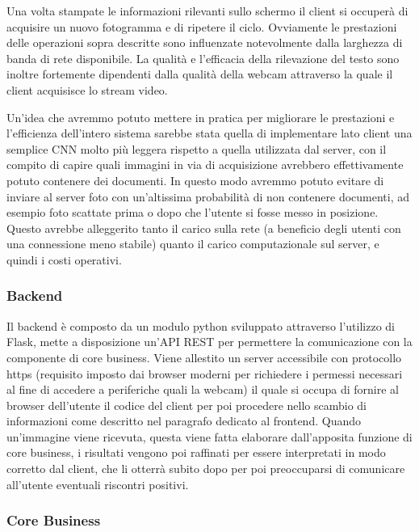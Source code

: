 \documentclass[12pt,a4paper]{article}
\begin{document}
Una volta stampate le informazioni rilevanti sullo schermo il client si
occuperà di acquisire un nuovo fotogramma e di ripetere il ciclo.
Ovviamente le prestazioni delle operazioni sopra descritte sono
influenzate notevolmente dalla larghezza di banda di rete disponibile.
La qualità e l'efficacia della rilevazione del testo sono inoltre
fortemente dipendenti dalla qualità della webcam attraverso la quale il
client acquisisce lo stream video.

Un'idea che avremmo potuto mettere in pratica per migliorare le
prestazioni e l'efficienza dell'intero sistema sarebbe stata quella di
implementare lato client una semplice CNN molto più leggera rispetto a
quella utilizzata dal server, con il compito di capire quali immagini in
via di acquisizione avrebbero effettivamente potuto contenere dei
documenti. In questo modo avremmo potuto evitare di inviare al server
foto con un'altissima probabilità di non contenere documenti, ad esempio
foto scattate prima o dopo che l'utente si fosse messo in posizione.
Questo avrebbe alleggerito tanto il carico sulla rete (a beneficio degli
utenti con una connessione meno stabile) quanto il carico computazionale
sul server, e quindi i costi operativi.

\subsubsection{Backend}

Il backend è composto da un modulo python sviluppato attraverso l'utilizzo di Flask,
mette a disposizione un'API REST per permettere la
comunicazione con la componente di core business. Viene
allestito un server accessibile con protocollo https (requisito imposto dai
browser moderni per richiedere i permessi necessari al fine di accedere
a periferiche quali la webcam) il quale si occupa di fornire al browser
dell'utente il codice del client per poi procedere nello scambio di
informazioni come descritto nel paragrafo dedicato al frontend. Quando
un'immagine viene ricevuta, questa viene fatta elaborare dall'apposita
funzione di core business, i risultati vengono poi raffinati per essere
interpretati in modo corretto dal client, che li otterrà subito dopo
per poi preoccuparsi di comunicare all'utente eventuali riscontri positivi.

\subsubsection{Core Business}
\end{document}
